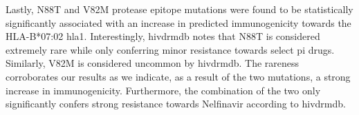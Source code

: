 Lastly, N88T and V82M protease epitope mutations were found to be statistically significantly associated with an increase in predicted immunogenicity towards the HLA-B*07:02 \ac{hla1}. Interestingly, \ac{hivdrmdb} notes that N88T is considered extremely rare while only conferring minor resistance towards select \ac{pi} drugs. Similarly, V82M is considered uncommon by \ac{hivdrmdb}. The rareness corroborates our results as we indicate, as a result of the two mutations, a strong increase in immunogenicity. Furthermore, the combination of the two only significantly confers strong resistance towards Nelfinavir according to \ac{hivdrmdb}.
